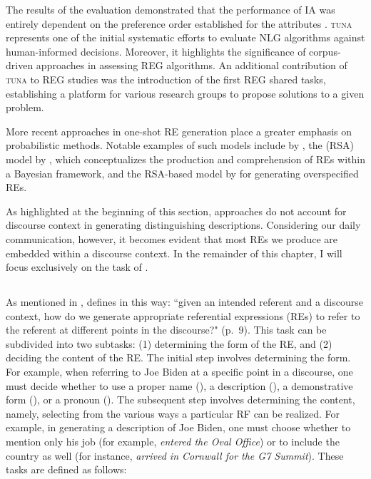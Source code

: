 \newpage
The results of the evaluation demonstrated that the performance of IA was entirely dependent on the preference order established for the attributes \citep{gatt2007evaluating}. \textsc{tuna} represents one of the initial systematic efforts to evaluate NLG algorithms against human-informed decisions. Moreover, it highlights the significance of corpus-driven approaches in assessing REG algorithms. An additional contribution of \textsc{tuna} to REG studies was the introduction of the first REG shared tasks, establishing a platform for various research groups to propose solutions to a given problem. 

More recent approaches in one-shot RE generation place a greater emphasis on probabilistic methods. Notable examples of such models include  by \citet{Gompel2019}, the  (RSA) model by \citet{Frank2012}, which conceptualizes the production and comprehension of REs within a Bayesian framework, and the RSA-based model by \citet{Degen2020} for generating overspecified REs.

As highlighted at the beginning of this section, \shot approaches do not account for discourse context in generating distinguishing descriptions. Considering our daily communication, however, it becomes evident that most REs we produce are embedded within a discourse context. In the remainder of this chapter, I will focus exclusively on the task of \context.

\subsection{\context}\label{subsec:referentialChoice}

As mentioned in , \citet{belz2007generation} defines \context in this way: ``given an intended referent and a discourse context, how do we generate appropriate referential expressions (REs) to refer to the referent at different points in the discourse?" (p.~9). This task can be subdivided into two subtasks: (1) determining the form of the RE, and (2) deciding the content of the RE. The initial step involves determining the form. For example, when referring to Joe Biden at a specific point in a discourse, one must decide whether to use a proper name (), a description (), a demonstrative form (), or a pronoun (). The subsequent step involves determining the content, namely, selecting from the various ways a particular RF can be realized. For example, in generating a description of Joe Biden, one must choose whether to mention only his job (for example,  \textit{entered the Oval Office}) or to include the country as well (for instance,  \textit{arrived in Cornwall for the G7 Summit}). These tasks are defined as follows:

